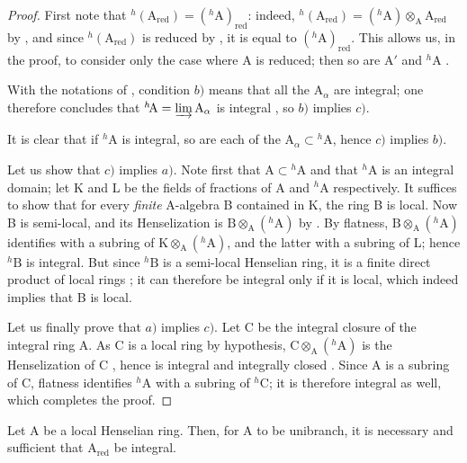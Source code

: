 \begin{proof}
First note that ${}^h(\mathrm{A}_{\mathrm{red}})=({}^h\!\mathrm{A})_{\mathrm{red}}$: indeed, ${}^h(\mathrm{A}_{\mathrm{red}})=({}^h\!\mathrm{A})\otimes_{\mathrm{A}}\mathrm{A}_{\mathrm{red}}$ by , and since ${}^h(\mathrm{A}_{\mathrm{red}})$ is reduced by , it is equal to $({}^h\!\mathrm{A})_{\mathrm{red}}$.
This allows us, in the proof, to consider only the case where A is reduced; then so are $\mathrm{A}'$  and ${}^h\!\mathrm{A}$ .

With the notations of , condition $b)$ means that all the $\mathrm{A}_\alpha$ are integral; one therefore concludes that ${}^h\!\mathrm{A}=\varinjlim\mathrm{A}_\alpha$ is integral , so $b)$ implies $c)$.

It is clear that if ${}^h\!\mathrm{A}$ is integral, so are each of the $\mathrm{A}_\alpha\subset{}^h\!\mathrm{A}$, hence $c)$ implies $b)$.

Let us show that $c)$ implies $a)$.
Note first that $\mathrm{A}\subset{}^h\!\mathrm{A}$ and that ${}^h\!\mathrm{A}$ is an integral domain;
let K and L be the fields of fractions of A and ${}^h\!\mathrm{A}$ respectively.
It suffices to show that for every \emph{finite} A-algebra B contained in K, the ring B is local.  Now B is semi-local, and its Henselization is $\mathrm{B}\otimes_{\mathrm{A}}({}^h\!\mathrm{A})$ by .  By flatness, $\mathrm{B}\otimes_{\mathrm{A}}({}^h\!\mathrm{A})$ identifies with a subring of $\mathrm{K}\otimes_{\mathrm{A}}({}^h\!\mathrm{A})$, and the latter with a subring of L; hence ${}^h\!\mathrm{B}$ is integral.  But since ${}^h\!\mathrm{B}$ is a semi-local Henselian ring, it is a finite direct product of local rings ; it can therefore be integral only if it is local, which indeed implies that B is local.

Let us finally prove that $a)$ implies $c)$.
Let C be the integral closure of the integral ring A.
As C is a local ring by hypothesis, $\mathrm{C}\otimes_{\mathrm{A}}({}^h\!\mathrm{A})$ is the Henselization of C , hence is integral and integrally closed .
Since A is a subring of C, flatness identifies ${}^h\!\mathrm{A}$ with a subring of ${}^h\!\mathrm{C}$; it is therefore integral as well, which completes the proof.
\end{proof}

\begin{corollary}[18.6.13]
\label{IV.18.6.13}
Let $\mathrm{A}$ be a local Henselian ring.
Then, for A to be unibranch, it is necessary and sufficient that $\mathrm{A}_{\mathrm{red}}$ be integral.
\end{corollary}

